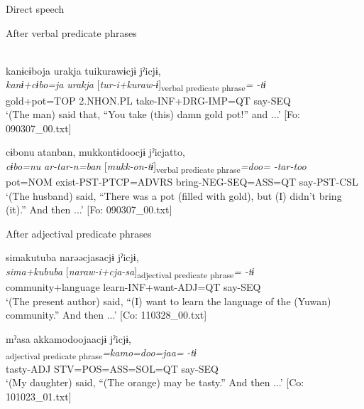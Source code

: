 \ea\label{ex:10.62}   Direct speech\\
  \begin{xlist}
  \exi{} After verbal predicate phrases

  \ex\relax [= (8-148 g)]\\
      \glll    kanɨcɨboja  urakja  tuikurawɨcjɨ  jˀicjɨ,\\
      \textit{kanɨ+cɨbo=ja}  \textit{urakja}  [\textit{tur-i+kuraw-ɨ}]\textsubscript{verbal predicate phrase}\textit{=}  \textit{-tɨ}\\
      gold+pot=TOP  2.NHON.PL  take-INF+DRG-IMP=QT  say-SEQ\\
      \glt       ‘(The man) said that, “You take (this) damn gold pot!” and ...’ [Fo: 090307\_00.txt]

  \ex %
      \glll    cɨbonu  atanban,  mukkontɨdoocjɨ     jˀicjatto,\\
      \textit{cɨbo=nu}  \textit{ar-tar-n=ban}  [\textit{mukk-on-tɨ}]\textsubscript{verbal predicate phrase}\textit{=doo=}   \textit{-tar-too}\\
      pot=NOM  exist-PST-PTCP=ADVRS  bring-NEG-SEQ=ASS=QT   say-PST-CSL\\
      \glt       ‘(The husband) said, “There was a pot (filled with gold), but (I) didn’t bring (it).” And then ...’ [Fo: 090307\_00.txt]

  \exi{} After adjectival predicate phrases

  \ex  %
      \glll    simakutuba  narəəcjasacjɨ  jˀicjɨ,\\
      \textit{sima+kububa}  [\textit{naraw-i+cja-sa}]\textsubscript{adjectival predicate phrase}\textit{=}  \textit{-tɨ}\\
      community+language  learn-INF+want-ADJ=QT  say-SEQ\\
      \glt       ‘(The present author) said, “(I) want to learn the language of the (Yuwan) community.” And then ...’ [Co: 110328\_00.txt]

  \ex  %
      \glll    mˀasa  akkamodoojaacjɨ  jˀicjɨ,\\
      [\textit{mˀa-sa}  \textit{ar}]\textsubscript{adjectival predicate phrase}\textit{=kamo=doo=jaa=}  \textit{-tɨ}\\
      tasty-ADJ  STV=POS=ASS=SOL=QT  say-SEQ\\
      \glt       ‘(My daughter) said, “(The orange) may be tasty.” And then ...’ [Co: 101023\_01.txt]


\end{xlist}
